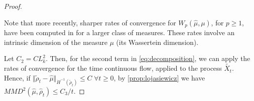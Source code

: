 \begin{proof}
	\begin{remark}
		Note that more recently, sharper rates of convergence  for $W_p(\widehat{ \mu}, \mu)$, for $p\ge 1$, have been computed in \cite{weed2017sharp} for a larger class of measures. These rates involve an intrinsic dimension of the measure $\mu$ (its Wassertein dimension). 
	\end{remark}
	Let $C_2=C L_k^2$. Then, for the second term in \eqref{eq:decomposition}, we can apply the rates of convergence for the time continuous flow, applied to the process $\widetilde{X_t}$. Hence, if $\Vert \widetilde{\rho}_t  - \widehat{\mu} \Vert_{\dot{H}^{-1}(\widetilde{\rho}_t)} \leq C \; \forall t\geq 0$, by \cref{prop:lojasiewicz} we have $MMD^2(\widehat{ \mu},\widehat{\rho}_t)\le C_3/t$. 
\end{proof}
